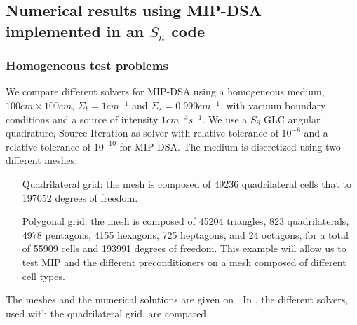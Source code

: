 \subsection{Numerical results using MIP-DSA implemented in an $S_n$ code}

\subsubsection{Homogeneous test problems}  \label{sec_homog}

We compare different solvers for MIP-DSA using a homogeneous medium, $100cm
\times 100cm$, $\Sigma_t = 1cm^{-1}$ and $\Sigma_s = 0.999cm^{-1}$, with
vacuum boundary conditions and a source of intensity $1cm^{-3}s^{-1}$. We
use a $S_8$ GLC angular quadrature, Source Iteration as solver
with relative tolerance of $10^{-8}$ and a relative tolerance of
$10^{-10}$ for MIP-DSA. The medium is discretized using two different meshes:
\begin{enumerate}
  \item[Quadrilateral grid:] the mesh is composed of 49236 quadrilateral
    cells that to 197052 degrees of freedom.
  \item[Polygonal grid:] the mesh is composed of 45204 triangles, 823
    quadrilaterals, 4978 pentagons, 4155 hexagons, 725 heptagons, and 24
    octagons, for a total of 55909 cells and 193991 degrees of freedom. This
    example will allow us to test MIP and the different preconditioners on a
    mesh composed of different cell types.
\end{enumerate}
%
The meshes and the numerical solutions are given on .
In , the different solvers, used with the
quadrilateral grid, are compared.
%
